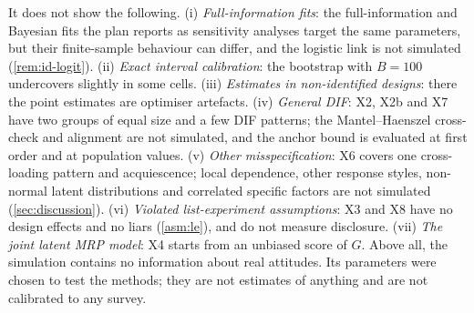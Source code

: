 It does not show the following. (i) \emph{Full-information fits}: the full-information and Bayesian fits the plan reports as sensitivity analyses target the same parameters, but their finite-sample behaviour can differ, and the logistic link is not simulated (\cref{rem:id-logit}). (ii) \emph{Exact interval calibration}: the bootstrap with $B=100$ undercovers slightly in some cells. (iii) \emph{Estimates in non-identified designs}: there the point estimates are optimiser artefacts. (iv) \emph{General DIF}: X2, X2b and X7 have two groups of equal size and a few DIF patterns; the Mantel--Haenszel cross-check and alignment are not simulated, and the anchor bound is evaluated at first order and at population values. (v) \emph{Other misspecification}: X6 covers one cross-loading pattern and acquiescence; local dependence, other response styles, non-normal latent distributions and correlated specific factors are not simulated (\cref{sec:discussion}). (vi) \emph{Violated list-experiment assumptions}: X3 and X8 have no design effects and no liars (\cref{asm:le}), and do not measure disclosure. (vii) \emph{The joint latent MRP model}: X4 starts from an unbiased score of $G$. Above all, the simulation contains no information about real attitudes. Its parameters were chosen to test the methods; they are not estimates of anything and are not calibrated to any survey.

